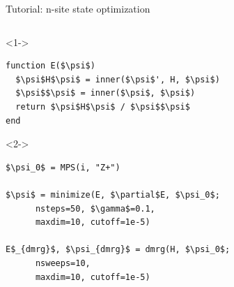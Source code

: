 \begin{frame}[fragile]{Tutorial: n-site state optimization}

\begin{columns}

\begin{column}{5cm}

\begin{onlyenv}<1->
\begin{lstlisting}[language=JuliaLocal, style=julia, mathescape, basicstyle=\scriptsize\ttfamily]
function E($\psi$)
  $\psi$H$\psi$ = inner($\psi$', H, $\psi$)
  $\psi$$\psi$ = inner($\psi$, $\psi$)
  return $\psi$H$\psi$ / $\psi$$\psi$
end
\end{lstlisting}
\end{onlyenv}

\begin{onlyenv}<2->
\begin{lstlisting}[language=JuliaLocal, style=julia, mathescape, basicstyle=\scriptsize\ttfamily]
$\psi_0$ = MPS(i, "Z+")

$\psi$ = minimize(E, $\partial$E, $\psi_0$;
      nsteps=50, $\gamma$=0.1,
      maxdim=10, cutoff=1e-5)

E$_{dmrg}$, $\psi_{dmrg}$ = dmrg(H, $\psi_0$;
      nsweeps=10,
      maxdim=10, cutoff=1e-5)
\end{lstlisting}
\end{onlyenv}

\end{column}

\begin{column}{5.5cm}



\end{column}
\end{columns}
\end{frame}
